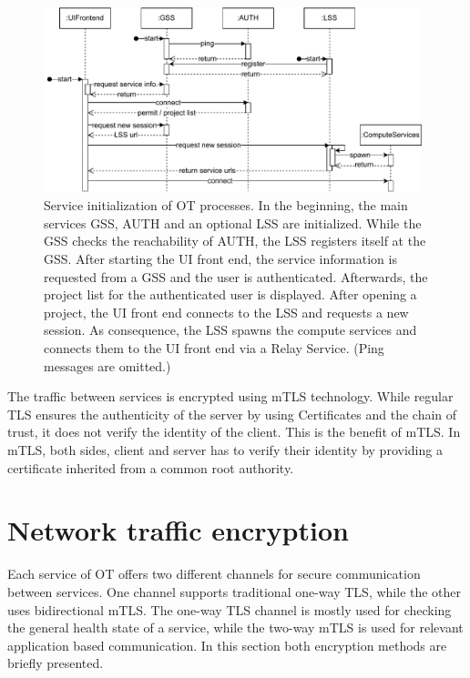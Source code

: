 \begin{figure}[h]
	\centering
	\includegraphics[width=0.98\textwidth]{Figures/opentwin-network-communication-sequence.pdf}
	\caption{Service initialization of \ac{OT} processes. In the beginning, the main services \ac{GSS}, \ac{AUTH} and an optional \ac{LSS} are initialized. While the \ac{GSS} checks the reachability of \ac{AUTH}, the \ac{LSS} registers itself at the \ac{GSS}. After starting the \ac{UI} front end, the service information is requested from a \ac{GSS} and the user is authenticated. Afterwards, the project list for the authenticated user is displayed. After opening a project, the \ac{UI} front end connects to the \ac{LSS} and requests a new session. As consequence, the \ac{LSS} spawns the compute services and connects them to the \ac{UI} front end via a Relay Service. (Ping messages are omitted.)}
	\label{fig:ot-network-communication-sequence}
\end{figure}

The traffic between services is encrypted using \ac{mTLS} technology. While regular \ac{TLS} ensures the authenticity of the server by using Certificates and the chain of trust, it does not verify the identity of the client. This is the benefit of \ac{mTLS}. In \ac{mTLS}, both sides, client and server has to verify their identity by providing a certificate inherited from a common root authority.



\section{Network traffic encryption}
Each service of \ac{OT} offers two different channels for secure communication between services. One channel supports traditional one-way \ac{TLS}, while the other uses bidirectional \ac{mTLS}. The one-way \ac{TLS} channel is mostly used for checking the general health state of a service, while the two-way \ac{mTLS} is used for relevant application based communication.
In this section both encryption methods are briefly presented.

